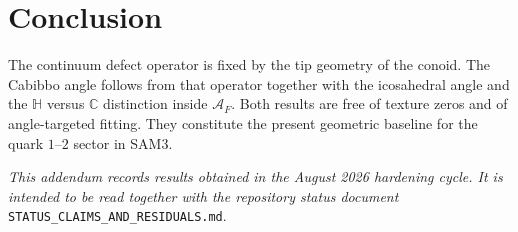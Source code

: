 \documentclass[11pt,a4paper]{article}
\begin{document}
\section{Conclusion}

The continuum defect operator is fixed by the tip geometry of the conoid. The Cabibbo angle follows from that operator together with the icosahedral angle and the $\mathbb{H}$ versus $\mathbb{C}$ distinction inside $\mathcal{A}_F$. Both results are free of texture zeros and of angle-targeted fitting. They constitute the present geometric baseline for the quark $1$--$2$ sector in SAM3.

\vspace{1em}
\noindent\textit{This addendum records results obtained in the August 2026 hardening cycle. It is intended to be read together with the repository status document} \texttt{STATUS\_CLAIMS\_AND\_RESIDUALS.md}.
\end{document}
